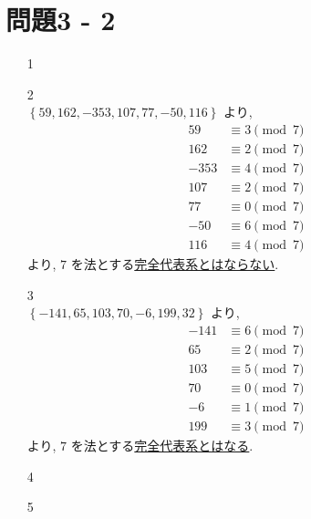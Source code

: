 \documentclass[12pt,a4paper]{jsarticle}
\begin{document}
\section*{問題3 - 2}
\begin{enumerate}
 \item[1]  \mbox{} \\
 \item[2]  \mbox{} \\
 $\left\{ 59, 162, -353, 107, 77, -50, 116 \right\}$ より,
 \begin{align*}
 59 &\equiv 3 \pmod{7} \\
 162 &\equiv 2 \pmod{7} \\
 -353 &\equiv 4 \pmod{7} \\
 107 &\equiv 2 \pmod{7} \\
 77 &\equiv 0 \pmod{7} \\
 -50 &\equiv 6 \pmod{7} \\
 116 &\equiv 4 \pmod{7} 
 \end{align*}
 より, $7$ を法とする\underline{完全代表系とはならない}.
 \item[3]  \mbox{} \\
 $\left\{ -141, 65, 103, 70, -6, 199, 32 \right\}$ より,
 \begin{align*}
 -141 &\equiv 6 \pmod{7} \\
 65 &\equiv 2 \pmod{7} \\
 103 &\equiv 5 \pmod{7} \\
 70 &\equiv 0 \pmod{7} \\
 -6 &\equiv 1 \pmod{7} \\
 199 &\equiv 3 \pmod{7}
 \end{align*}
 より, $7$ を法とする\underline{完全代表系とはなる}.
 \item[4]  \mbox{} \\
 \item[5]  \mbox{} \\
\end{enumerate}
\pagebreak
\end{document}
